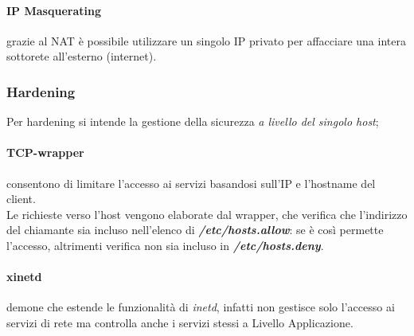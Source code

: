 \documentclass[a4paper,11pt]{article}
\def\subsub#1{\subsubsection{#1}\label{#1}}
\begin{document}
\paragraph{IP Masquerating} grazie al NAT è possibile utilizzare un singolo IP privato per affacciare una intera sottorete all'esterno (internet).
\subsub{Hardening} 
Per hardening si intende la gestione della sicurezza \textit{a livello del singolo host};

\paragraph{TCP-wrapper} consentono di limitare l'accesso ai servizi basandosi sull'IP e l'hostname del client. \\
Le richieste verso l'host vengono elaborate dal wrapper, che verifica che l'indirizzo del chiamante sia incluso nell'elenco di \textbf{\textit{/etc/hosts.allow}}: se è così permette l'accesso, altrimenti verifica non sia incluso in \textit{\textbf{/etc/hosts.deny}}.
\paragraph{xinetd} demone che estende le funzionalità di \textit{inetd}, infatti non gestisce solo l'accesso ai servizi di rete ma controlla anche i servizi stessi a Livello Applicazione.
\end{document}
